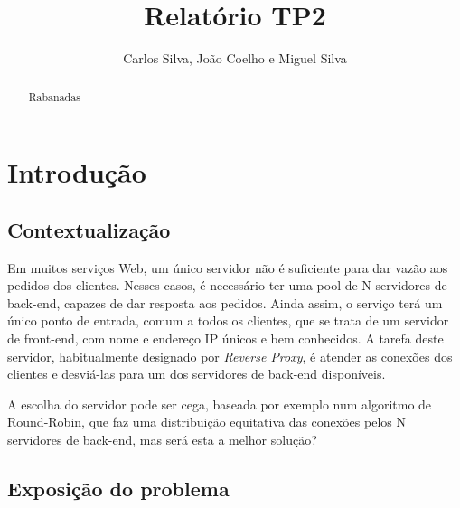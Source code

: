 \documentclass{llncs}
\begin{document}
\title{Relatório TP2}
\author{Carlos Silva, João Coelho e Miguel Silva}


\date{}


\maketitle

\begin{abstract}
Rabanadas
\end{abstract}

\newpage

\section{Introdução}

\subsection{Contextualização}

Em muitos serviços Web, um único servidor não é suficiente para dar vazão aos pedidos dos clientes. Nesses casos, é necessário ter uma pool de N servidores de back-end, capazes de dar resposta aos pedidos. Ainda assim, o serviço terá um único ponto de entrada, comum a todos os
clientes, que se trata de um servidor de front-end, com nome e endereço IP únicos e bem conhecidos. A tarefa deste servidor, habitualmente designado por \textit{Reverse Proxy}, é atender as conexões dos clientes e desviá-las para um dos servidores de back-end disponíveis.\par
A escolha do servidor pode ser cega, baseada por exemplo num algoritmo de Round-Robin, que faz uma distribuição equitativa das conexões pelos N servidores de back-end, mas será esta a melhor solução?

\subsection{Exposição do problema}
\end{document}
